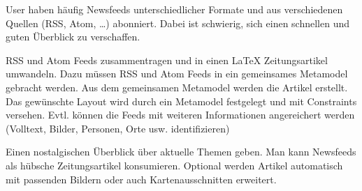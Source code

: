 \documentclass{article}
\date{\today}
\begin{document}
\maketitle

\begin{multicols}{3}{
		User haben häufig Newsfeeds unterschiedlicher Formate und aus verschiedenen Quellen (RSS, Atom, …) abonniert. Dabei ist schwierig, sich einen schnellen und guten Überblick zu verschaffen. 
		\closearticle
		
		RSS und Atom Feeds zusammentragen und in einen  LaTeX Zeitungsartikel umwandeln. Dazu müssen RSS und Atom Feeds in ein gemeinsames Metamodel gebracht werden. Aus dem gemeinsamen Metamodel werden die Artikel erstellt. Das gewünschte Layout wird durch ein Metamodel festgelegt und mit Constraints versehen. Evtl. können die Feeds mit weiteren Informationen angereichert werden (Volltext, Bilder, Personen, Orte usw. identifizieren)
		\closearticle
		
		Einen nostalgischen Überblick über aktuelle Themen geben. Man kann Newsfeeds als hübsche Zeitungsartikel konsumieren. Optional werden Artikel automatisch mit passenden Bildern oder auch Kartenausschnitten erweitert. 
		\closearticle
		
}
\end{multicols}
\end{document}

